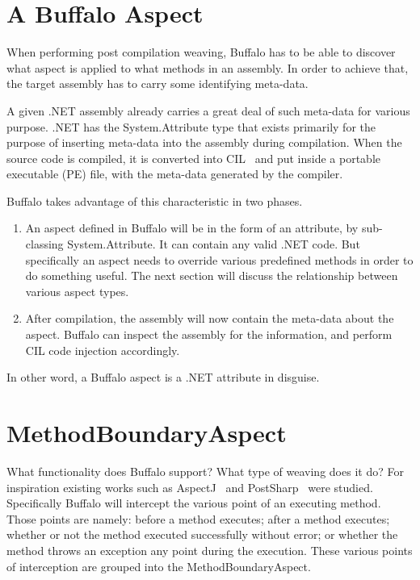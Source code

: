 \section{A Buffalo Aspect}

When performing post compilation weaving, Buffalo has to be able to discover what aspect is applied to what methods in an assembly. In order to achieve that, the target assembly has to carry some identifying meta-data.

A given .NET assembly already carries a great deal of such meta-data for various purpose. .NET has the System.Attribute type that exists primarily for the purpose of inserting meta-data into the assembly during compilation. When the source code is compiled, it is converted into CIL~\cite{msil_text} and put inside a portable executable (PE) file, with the meta-data generated by the compiler. 

Buffalo takes advantage of this characteristic in two phases.
\begin{enumerate}
	\item An aspect defined in Buffalo will be in the form of an attribute, by sub-classing System.Attribute. It can contain any valid .NET code. But specifically an aspect needs to override various predefined methods in order to do something useful. The next section will discuss the relationship between various aspect types.
	\item After compilation, the assembly will now contain the meta-data about the aspect. Buffalo can inspect the assembly for the information, and perform CIL code injection accordingly.
\end{enumerate}

In other word, a Buffalo aspect is a .NET attribute in disguise.

\section{MethodBoundaryAspect}
What functionality does Buffalo support? What type of weaving does it do? For inspiration existing works such as AspectJ~\cite{aspectj_faq} and PostSharp~\cite{postsharp} were studied. Specifically Buffalo will intercept the various point of an executing method. Those points are namely: before a method executes; after a method executes; whether or not the method executed successfully without error; or whether the method throws an exception any point during the execution. These various points of interception are grouped into the MethodBoundaryAspect.

